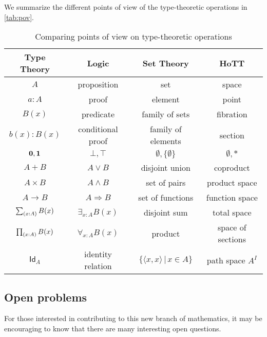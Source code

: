 We summarize the different points of view of the type-theoretic operations in \autoref{tab:pov}.

\begin{table}\centering
  \begin{tabular}{c||c|c|c}
       Type Theory & Logic & Set Theory & HoTT\\\hline
       $A$ & proposition & set & space\\
       $a:A$ & proof & element & point \\
       $B(x)$ & predicate & family of sets & fibration \\
       $b(x) : B(x)$ & conditional proof & family of elements & section\\
       $\mathbf{0}, \mathbf{1}$ & $\bot, \top$ & $\emptyset, \{ \emptyset \}$ & $\emptyset, *$\\
       $A + B$ & $A\vee B$ & disjoint union & coproduct\\
       $A\times B$ & $A\wedge B$ & set of pairs & product space\\
       $A\to B$ & $A\Rightarrow B$ & set of functions & function space\\
       $\sm{x:A}B(x)$ &  $\exists_{x:A}B(x)$ & disjoint sum & total space\\
       $\prd{x:A}B(x)$ &  $\forall_{x:A}B(x)$ & product & space of sections\\
       $\mathsf{Id}_{A}$ & identity relation & $\{\langle x,x\rangle\, |\, x\in A\}$ & path space $A^I$
  \end{tabular}
  \caption{Comparing points of view on type-theoretic operations}\label{tab:pov}
\end{table}


\subsection*{Open problems} 

For those interested in contributing to this new branch of mathematics, it may be encouraging to know that there are many interesting open questions.

